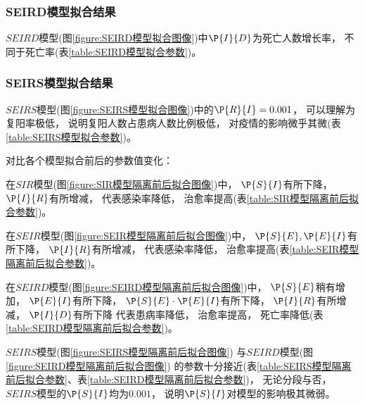 \subsubsection{SEIRD模型拟合结果}
\par $SEIRD$模型(图\ref{figure:SEIRD模型拟合图像})中$\P{I}{D}$为死亡人数增长率，
不同于死亡率(表\ref{table:SEIRD模型拟合参数})。
\subsubsection{SEIRS模型拟合结果}
\par $SEIRS$模型(图\ref{figure:SEIRS模型拟合图像})中的$\P{R}{I}=0.001$，
可以理解为复阳率极低，
说明复阳人数占患病人数比例极低，
对疫情的影响微乎其微(表\ref{table:SEIRS模型拟合参数})。
\par 对比各个模型拟合前后的参数值变化：
\par 在$SIR$模型(图\ref{figure:SIR模型隔离前后拟合图像})中，
$\P{S}{I}$有所下降，
$\P{I}{R}$有所增减，
代表感染率降低，
治愈率提高(表\ref{table:SIR模型隔离前后拟合参数})。
\par 在$SEIR$模型(图\ref{figure:SEIR模型隔离前后拟合图像})中，
$\P{S}{E},\P{E}{I}$有所下降，
$\P{I}{R}$有所增减，
代表感染率降低，
治愈率提高(表\ref{table:SEIR模型隔离前后拟合参数})。
\par 在$SEIRD$模型(图\ref{figure:SEIRD模型隔离前后拟合图像})中，
$\P{S}{E}$稍有增加，
$\P{E}{I}$有所下降，
$\P{S}{E}\cdot \P{E}{I}$有所下降，
$\P{I}{R}$有所增减，
$\P{I}{D}$有所下降
代表患病率降低，
治愈率提高，
死亡率降低(表\ref{table:SEIRD模型隔离前后拟合参数})。
\par $SEIRS$模型(图\ref{figure:SEIRS模型隔离前后拟合图像})
与$SEIRD$模型(图\ref{figure:SEIRD模型隔离前后拟合图像})
的参数十分接近(表\ref{table:SEIRS模型隔离前后拟合参数}、表\ref{table:SEIRD模型隔离前后拟合参数})，
无论分段与否，$SEIRS$模型的$\P{S}{I}$均为$0.001$，
说明$\P{S}{I}$对模型的影响极其微弱。
